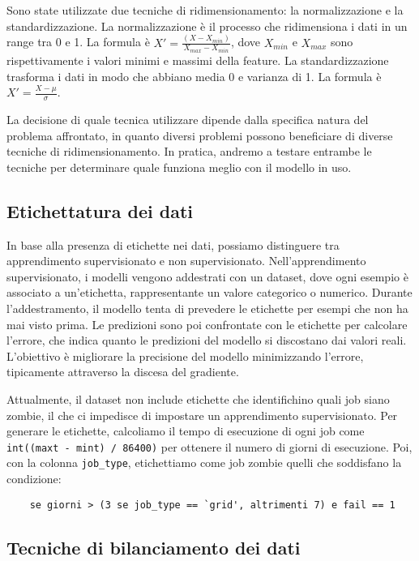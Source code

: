 Sono state utilizzate due tecniche di ridimensionamento: la normalizzazione e
la standardizzazione. La normalizzazione è il processo che ridimensiona i dati
in un range tra 0 e 1. La formula è $X'=\frac{(X-X_{min})}{X_{max}-X_{min}}$,
dove $X_{min}$ e $X_{max}$ sono rispettivamente i valori minimi e massimi
della feature. La standardizzazione trasforma i dati in modo che abbiano media
0 e varianza di 1. La formula è $X'=\frac{X-\mu}{\sigma}$.

La decisione di quale tecnica utilizzare dipende dalla specifica natura del
problema affrontato, in quanto diversi problemi possono beneficiare di diverse
tecniche di ridimensionamento. In pratica, andremo a testare entrambe le
tecniche per determinare quale funziona meglio con il modello in uso.

\subsection{Etichettatura dei dati}

In base alla presenza di etichette nei dati, possiamo distinguere tra
apprendimento supervisionato e non supervisionato. Nell'apprendimento
supervisionato, i modelli vengono addestrati con un dataset, dove ogni esempio
è associato a un'etichetta, rappresentante un valore categorico o numerico.
Durante l'addestramento, il modello tenta di prevedere le etichette per esempi
che non ha mai visto prima. Le predizioni sono poi confrontate con le
etichette per calcolare l'errore, che indica quanto le predizioni del modello
si discostano dai valori reali. L'obiettivo è migliorare la precisione del
modello minimizzando l'errore, tipicamente attraverso la discesa del
gradiente.

Attualmente, il dataset non include etichette che identifichino quali job
siano zombie, il che ci impedisce di impostare un apprendimento
supervisionato. Per generare le etichette, calcoliamo il tempo di esecuzione
di ogni job come \verb|int((maxt - mint) / 86400)| per ottenere il numero
di giorni di esecuzione. Poi, con la colonna \texttt{job\_type}, etichettiamo
come job zombie quelli che soddisfano la condizione:

\begin{verbatim}
    se giorni > (3 se job_type == `grid', altrimenti 7) e fail == 1 
\end{verbatim}

\subsection{Tecniche di bilanciamento dei dati}


